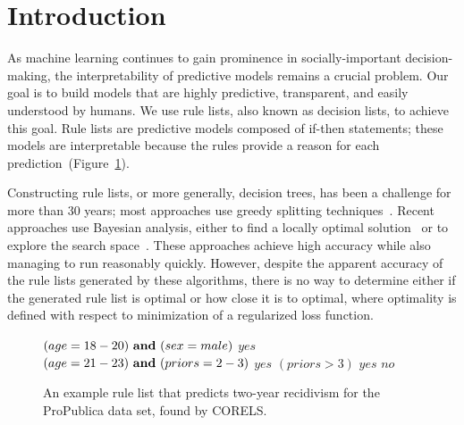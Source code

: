 \section{Introduction}

As machine learning continues to gain prominence in socially-important decision-making,
the interpretability of predictive models remains a crucial problem.
%
Our goal is to build models that are highly predictive, transparent, and easily understood by humans.
%
We use rule lists, also known as decision lists, to achieve this goal.
%
Rule lists are predictive models composed of if-then statements;
these models are interpretable because the rules provide a reason for each prediction~(Figure~\ref{fig:rule-list}).

Constructing rule lists, or more generally, decision trees, has been a challenge for more than
30 years; most approaches use greedy splitting techniques~\citep{Rivest87,Breiman84,Quinlan93}. 
%
Recent approaches use Bayesian analysis, either to find a locally optimal solution~\citep{Chipman:1998jh} or to explore the search space~\citep{LethamRuMcMa15, YangRuSe16}.
%
These approaches achieve high accuracy while also managing to run reasonably quickly.
%
However, despite the apparent accuracy of the rule lists generated by these algorithms,
there is no way to determine either if the generated rule list is optimal or how close it is to optimal,
where optimality is defined with respect to minimization of a regularized loss function.

\begin{arxiv}
\begin{figure}[t!]
\begin{algorithmic}
\State \bif $(age=18-20) {\bf ~and~} (sex=male)$ \bthen $yes$
\State \belif $(age=21-23)	 {\bf ~and~} (priors=2-3)$ \bthen $yes$
\State \belif $(priors>3)$ \bthen $yes$
\State \belse $no$
\end{algorithmic}
\caption{An example rule list that predicts two-year recidivism
for the ProPublica data set, found by CORELS.
}
\label{fig:rule-list}
\end{figure}
\end{arxiv}

